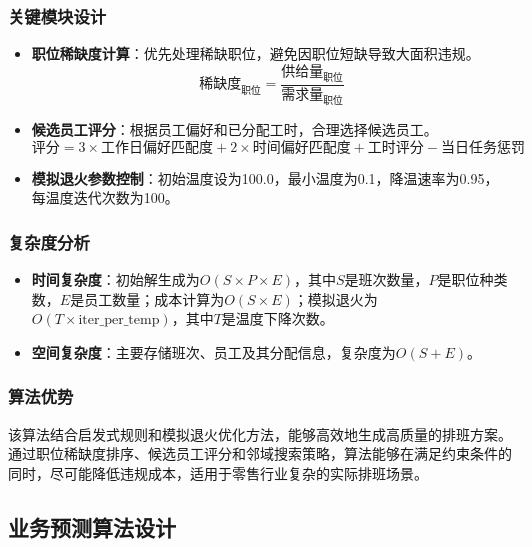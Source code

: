 \documentclass{ctexart}
\begin{document}
\subsubsection{关键模块设计}
\begin{itemize}
    \item \textbf{职位稀缺度计算}：优先处理稀缺职位，避免因职位短缺导致大面积违规。
    \begin{equation}
    \text{稀缺度}_{\text{职位}} = \frac{\text{供给量}_{\text{职位}}}{\text{需求量}_{\text{职位}}}
    \end{equation}
    
    \item \textbf{候选员工评分}：根据员工偏好和已分配工时，合理选择候选员工。
    \begin{equation}
    \text{评分} = 3 \times \text{工作日偏好匹配度} + 2 \times \text{时间偏好匹配度} + \text{工时评分} - \text{当日任务惩罚}
    \end{equation}
    
    \item \textbf{模拟退火参数控制}：初始温度设为100.0，最小温度为0.1，降温速率为0.95，每温度迭代次数为100。
\end{itemize}

\subsubsection{复杂度分析}
\begin{itemize}
    \item \textbf{时间复杂度}：初始解生成为$O(S \times P \times E)$，其中$S$是班次数量，$P$是职位种类数，$E$是员工数量；成本计算为$O(S \times E)$；模拟退火为$O(T \times \text{iter\_per\_temp})$，其中$T$是温度下降次数。
    
    \item \textbf{空间复杂度}：主要存储班次、员工及其分配信息，复杂度为$O(S + E)$。
\end{itemize}

\subsubsection{算法优势}
该算法结合启发式规则和模拟退火优化方法，能够高效地生成高质量的排班方案。通过职位稀缺度排序、候选员工评分和邻域搜索策略，算法能够在满足约束条件的同时，尽可能降低违规成本，适用于零售行业复杂的实际排班场景。

\subsection{业务预测算法设计}
\end{document}
